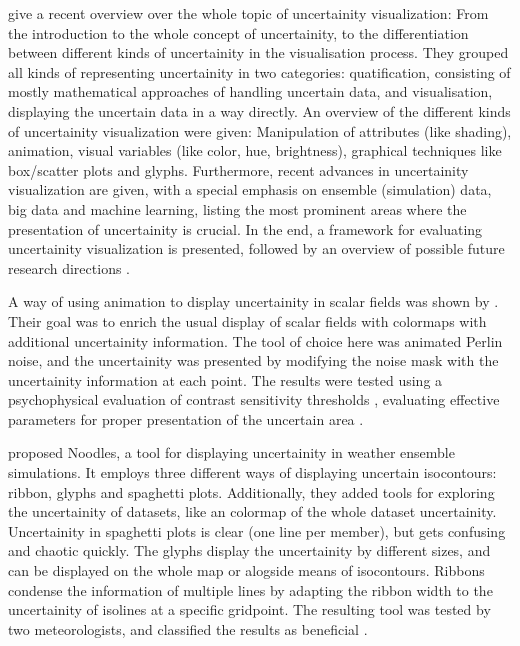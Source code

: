 \citeauthor{kamal_recent_2021} give a recent overview over the whole topic of uncertainity visualization: From the introduction to  the whole concept of uncertainity, to the differentiation between different kinds of uncertainity in the visualisation process.
They grouped all kinds of representing uncertainity in two categories: quatification, consisting of mostly mathematical approaches of handling uncertain data, and visualisation, displaying the uncertain data in a way directly. 
An overview of the different kinds of uncertainity visualization were given: Manipulation of attributes (like shading), animation, visual variables (like color, hue, brightness), graphical techniques like box/scatter plots and glyphs. 
Furthermore, recent advances in uncertainity visualization are given, with a special emphasis on ensemble (simulation) data, big data and machine learning, listing the most prominent areas where the presentation of uncertainity is crucial. 
In the end, a framework for evaluating uncertainity visualization is presented, followed by an overview of possible future research directions \cite{kamal_recent_2021}. 


A way of using animation to display uncertainity in scalar fields was shown by \citeauthor{coninx_visualization_2011}. 
Their goal was to enrich the usual display of scalar fields with colormaps with additional uncertainity information. 
The tool of choice here was animated Perlin noise, and the uncertainity was presented by modifying the noise mask with the uncertainity information at each point. 
The results were tested using a psychophysical evaluation of contrast sensitivity thresholds \cite{coninx_visualization_2011}, evaluating effective parameters for proper presentation of the uncertain area \cite{coninx_visualization_2011}.

\citeauthor{sanyal_noodles_2010} proposed Noodles, a tool for displaying uncertainity in weather ensemble simulations. 
It employs three different ways of displaying uncertain isocontours: ribbon, glyphs and spaghetti plots. 
Additionally, they added tools for exploring the uncertainity of datasets, like an colormap of the whole dataset uncertainity.  
Uncertainity in spaghetti plots is clear (one line per member), but gets confusing and chaotic quickly. 
The glyphs display the uncertainity by different sizes,  and can be displayed on the whole map or alogside means of isocontours. 
Ribbons condense the information of multiple lines by adapting the ribbon width to the uncertainity of isolines at a specific gridpoint. 
The resulting tool was tested by two meteorologists, and classified the results as beneficial \cite{sanyal_noodles_2010}.  


